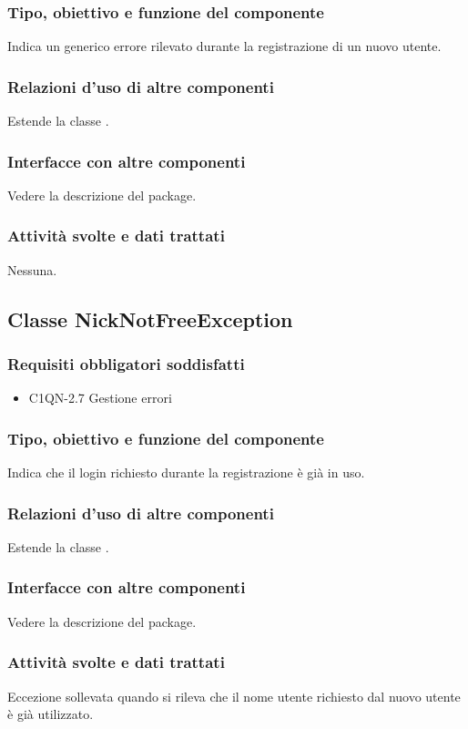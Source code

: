 \subsubsection*{Tipo, obiettivo e funzione del componente}
Indica un generico errore rilevato durante la registrazione di un nuovo utente.
\subsubsection*{Relazioni d'uso di altre componenti}
Estende la classe .
\subsubsection*{Interfacce con altre componenti}
Vedere la descrizione del package.
\subsubsection*{Attivit\`a svolte e dati trattati}
Nessuna.

\subsection{Classe NickNotFreeException}
\subsubsection*{Requisiti obbligatori soddisfatti}
\begin{itemize}
	\item C1QN-2.7 Gestione errori
\end{itemize}
\subsubsection*{Tipo, obiettivo e funzione del componente}
Indica che il login richiesto durante la registrazione \`e gi\`a in uso.
\subsubsection*{Relazioni d'uso di altre componenti}
Estende la classe .
\subsubsection*{Interfacce con altre componenti}
Vedere la descrizione del package.
\subsubsection*{Attivit\`a svolte e dati trattati}
Eccezione sollevata quando si rileva che il nome utente richiesto dal nuovo
utente \`e gi\`a utilizzato.

